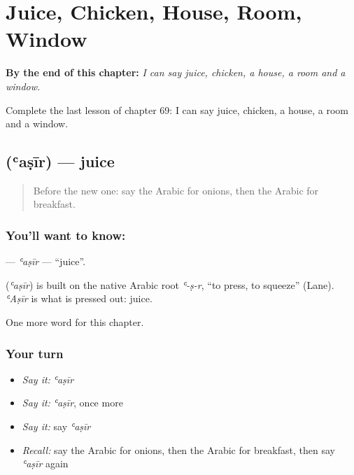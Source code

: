 
\chapter{Juice, Chicken, House, Room, Window}
\label{ch:ar-juice-chicken-house-room-window}

\begin{chapteropening}
\textbf{By the end of this chapter:} \emph{I can say juice, chicken, a house, a room and a window.}

Complete the last lesson of chapter 69: I can say juice, chicken, a house, a room and a window.
\end{chapteropening}

\section[\texorpdfstring{\ar{عصير} (ʿaṣīr)}{عصير (ʿaṣīr)}]{ (ʿaṣīr) — juice}

\label{lesson:AR-C69-asir}



\begin{quote}
Before the new one: say the Arabic for onions, then the Arabic for breakfast.
\end{quote}

\subsection*{You'll want to know: }
\textbf{} — \emph{ʿaṣīr} — \textquotedblleft{}juice\textquotedblright{}.

\begin{cousinweb}
\textbf{} (\emph{ʿaṣīr}) is built on the native Arabic root \emph{ʿ-ṣ-r}, \textquotedblleft{}to press, to squeeze\textquotedblright{} (Lane). \emph{ʿAṣīr} is what is pressed out: juice.
\end{cousinweb}

\begin{grammarlens}[title={What you've built}]
One more word for this chapter.
\end{grammarlens}

\subsection*{Your turn}
\begin{itemize}
\raggedright
  \item \emph{Say it:} \emph{ʿaṣīr}
  \item \emph{Say it:} \emph{ʿaṣīr}, once more
  \item \emph{Say it:} say \emph{ʿaṣīr}
  \item \emph{Recall:} say the Arabic for onions, then the Arabic for breakfast, then say \emph{ʿaṣīr} again
\end{itemize}


